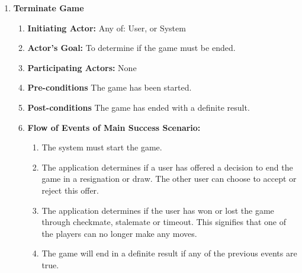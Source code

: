 \documentclass[12pt, titlepage]{article}
\begin{document}
\begin{enumerate}[{UC}1.]
                \item \textbf{Terminate Game}
                    \begin{enumerate}[{ }]
                        \item \textbf{Initiating Actor:} 
                            Any of: User, or System
            
                        \item \textbf{Actor's Goal:} 
                            To determine if the game must be ended.
                        
                        \item \textbf{Participating Actors:} 
                            None
                        
                        \item \textbf{Pre-conditions}
                            The game has been started.
                            
                        \item \textbf{Post-conditions}
                            The game has ended with a definite result.
                            
                        \item \textbf{Flow of Events of Main Success Scenario:}
                           \begin{enumerate}
                                \item The system must start the game.
                                \item The application determines if a user has offered a decision to end the game in a resignation or draw. The other user can choose to accept or reject this offer.
                                \item The application determines if the user has won or lost the game through checkmate, stalemate or timeout. This signifies that one of the players can no longer make any moves.
                                \item The game will end in a definite result if any of the previous events are true.
                            \end{enumerate}
                    \end{enumerate}
            \end{enumerate}
            \FloatBarrier
\end{document}
